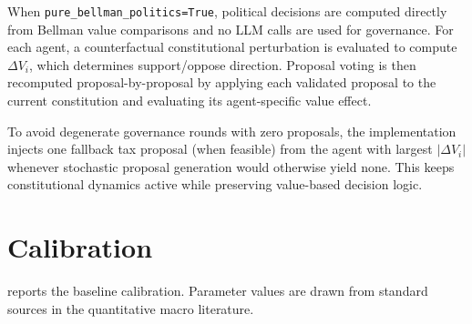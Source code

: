 \documentclass[12pt]{article}
\begin{document}
When \texttt{pure\_bellman\_politics=True}, political decisions are computed directly from Bellman value comparisons and no LLM calls are used for governance. For each agent, a counterfactual constitutional perturbation is evaluated to compute $\Delta V_i$, which determines support/oppose direction. Proposal voting is then recomputed proposal-by-proposal by applying each validated proposal to the current constitution and evaluating its agent-specific value effect.

To avoid degenerate governance rounds with zero proposals, the implementation injects one fallback tax proposal (when feasible) from the agent with largest $|\Delta V_i|$ whenever stochastic proposal generation would otherwise yield none. This keeps constitutional dynamics active while preserving value-based decision logic.


\section{Calibration}\label{sec:calibration}

 reports the baseline calibration. Parameter values are drawn from standard sources in the quantitative macro literature.
\end{document}
